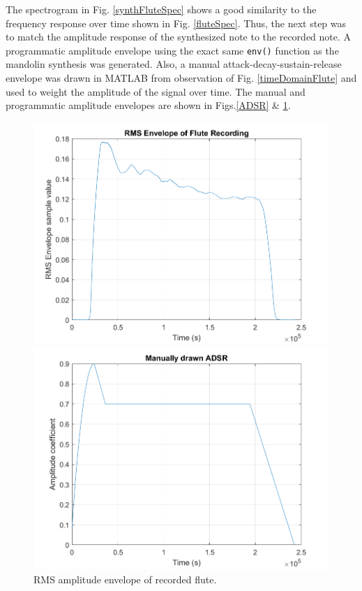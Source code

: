 \documentclass{article}
\begin{document}
            The spectrogram in Fig. \ref{synthFluteSpec} shows a good similarity to the frequency response over time shown in Fig. \ref{fluteSpec}.
            Thus, the next step was to match the amplitude response of the synthesized note to the recorded note.
            A programmatic amplitude envelope using the exact same \texttt{env()} function as the mandolin synthesis was generated.
            Also, a manual attack-decay-sustain-release envelope was drawn in MATLAB from observation of Fig. \ref{timeDomainFlute} and used to weight the amplitude of the signal over time.
            The manual and programmatic amplitude envelopes are shown in Figs.\ref{ADSR} \& \ref{envFlute}.
            \newpage
            \begin{figure}[H]
                \begin{minipage}{.49\textwidth}
                    \includegraphics[width=\linewidth]{images/envFlute.png}%
                    \centering
                    \caption{RMS amplitude envelope of recorded flute.}
                    \label{envFlute}
                \end{minipage}
                \begin{minipage}{.49\textwidth}
                    \includegraphics[width=\linewidth]{images/ADSR.png}%

\end{minipage}
\end{figure}
\end{document}
